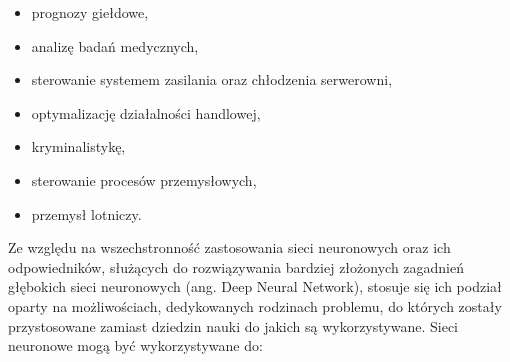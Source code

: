 \begin{itemize}
	\item prognozy giełdowe,
	\item analizę badań medycznych,
	\item sterowanie systemem zasilania oraz chłodzenia serwerowni,
	\item optymalizację działalności handlowej,
	\item kryminalistykę,
	\item sterowanie procesów przemysłowych,
	\item przemysł lotniczy.
\end{itemize}

Ze względu na wszechstronność zastosowania sieci neuronowych oraz ich odpowiedników, służących do rozwiązywania bardziej złożonych zagadnień głębokich sieci neuronowych (ang. Deep Neural Network), stosuje się ich podział oparty na możliwościach, dedykowanych rodzinach problemu, do których zostały przystosowane zamiast dziedzin nauki do jakich są wykorzystywane.
Sieci neuronowe mogą być wykorzystywane do:

